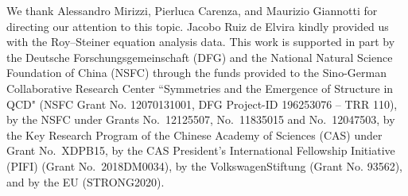 \documentclass[reprint,amssymb,amsmath,floatfix,aps,prd,groupedaddress,nofootinbib]{revtex4-2}
\begin{document}
\begin{acknowledgments}
We thank Alessandro Mirizzi, Pierluca Carenza, and Maurizio Giannotti for directing our attention to this topic.
Jacobo Ruiz de Elvira kindly provided us with the Roy--Steiner equation analysis data.
This work is supported in part by the Deutsche Forschungsgemeinschaft (DFG)
and the National Natural Science Foundation of China (NSFC) through the funds provided to the
Sino-German Collaborative Research Center ``Symmetries and the Emergence of Structure in QCD"
(NSFC Grant No. 12070131001, DFG
Project-ID 196253076 -- TRR 110), by the NSFC under Grants No.~12125507, No.~11835015 and No.~12047503, by the Key Research Program of the Chinese
Academy of Sciences (CAS) under Grant No.~XDPB15,  by the CAS 
President's International Fellowship
Initiative (PIFI) (Grant No.~2018DM0034), by the VolkswagenStiftung (Grant No. 93562), and by the
EU (STRONG2020). 
\end{acknowledgments}

%
%

\end{document}

